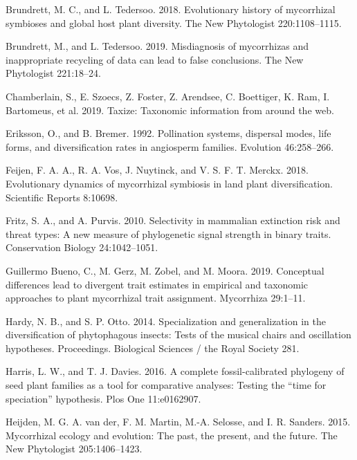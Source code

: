 \documentclass[12pt,]{article}
\begin{document}
\leavevmode\hypertarget{ref-brundrett_2018}{}%
Brundrett, M. C., and L. Tedersoo. 2018. Evolutionary history of
mycorrhizal symbioses and global host plant diversity. The New
Phytologist 220:1108--1115.

\leavevmode\hypertarget{ref-brundrett_2019}{}%
Brundrett, M., and L. Tedersoo. 2019. Misdiagnosis of mycorrhizas and
inappropriate recycling of data can lead to false conclusions. The New
Phytologist 221:18--24.

\leavevmode\hypertarget{ref-chamberlain_2019}{}%
Chamberlain, S., E. Szoecs, Z. Foster, Z. Arendsee, C. Boettiger, K.
Ram, I. Bartomeus, et al. 2019. Taxize: Taxonomic information from
around the web.

\leavevmode\hypertarget{ref-eriksson_1992}{}%
Eriksson, O., and B. Bremer. 1992. Pollination systems, dispersal modes,
life forms, and diversification rates in angiosperm families. Evolution
46:258--266.

\leavevmode\hypertarget{ref-feijen_2018}{}%
Feijen, F. A. A., R. A. Vos, J. Nuytinck, and V. S. F. T. Merckx. 2018.
Evolutionary dynamics of mycorrhizal symbiosis in land plant
diversification. Scientific Reports 8:10698.

\leavevmode\hypertarget{ref-fritz_2010}{}%
Fritz, S. A., and A. Purvis. 2010. Selectivity in mammalian extinction
risk and threat types: A new measure of phylogenetic signal strength in
binary traits. Conservation Biology 24:1042--1051.

\leavevmode\hypertarget{ref-guillermobueno_2019}{}%
Guillermo Bueno, C., M. Gerz, M. Zobel, and M. Moora. 2019. Conceptual
differences lead to divergent trait estimates in empirical and taxonomic
approaches to plant mycorrhizal trait assignment. Mycorrhiza 29:1--11.

\leavevmode\hypertarget{ref-hardy_2014}{}%
Hardy, N. B., and S. P. Otto. 2014. Specialization and generalization in
the diversification of phytophagous insects: Tests of the musical chairs
and oscillation hypotheses. Proceedings. Biological Sciences / the Royal
Society 281.

\leavevmode\hypertarget{ref-Harris_Davies_2016}{}%
Harris, L. W., and T. J. Davies. 2016. A complete fossil-calibrated
phylogeny of seed plant families as a tool for comparative analyses:
Testing the ``time for speciation'' hypothesis. Plos One 11:e0162907.

\leavevmode\hypertarget{ref-vanderheijden_2015}{}%
Heijden, M. G. A. van der, F. M. Martin, M.-A. Selosse, and I. R.
Sanders. 2015. Mycorrhizal ecology and evolution: The past, the present,
and the future. The New Phytologist 205:1406--1423.
\end{document}
